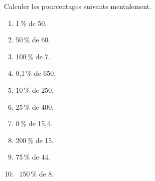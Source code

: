 \begin{exercice*}
   Calculer les pourcentages suivants mentalement.
   \begin{multicols}{2}
   \begin{enumerate}
      \item 1\,\% de 50.
      \item 50\,\% de 60.
      \item 100\,\% de 7.
      \item 0,1\,\% de 650.
      \item 10\,\% de 250.
      \columnbreak
      \item 25\,\% de 400.
      \item 0\,\% de 15,4.
      \item 200\,\% de 15.
      \item 75\,\% de 44.
      \item \, 150\,\% de 8.
   \end{enumerate}
   \end{multicols}
\end{exercice*}
   